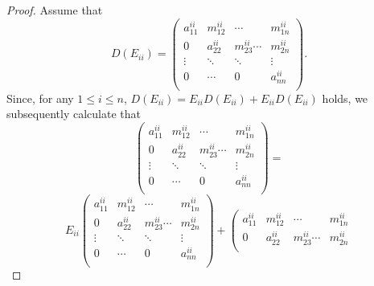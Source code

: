 \documentclass[12pt, reqno]{amsart}
\theoremstyle{definition}
\numberwithin{equation}{section}
\begin{document}
 \begin{proof} Assume that $$D(E_{ii})=\left(
                               \begin{array}{ccccc}
                                 a_{11}^{ii} &m_{12}^{ii}&\cdots &  m_{1n}^{ii} \\
                                 0 & a_{22}^{ii}&m_{23}^{ii}\cdots &m_{2n}^{ii}\\
                                   \vdots &\ddots&\ddots&\vdots  \\
                                   0 &\cdots &0& a_{nn}^{ii}\\
                               \end{array}
                             \right).$$ Since, for any $1\leq i\leq n$, $D(E_{ii})=E_{ii}D(E_{ii})+E_{ii}D(E_{ii})$ holds, we subsequently calculate that
                             $$\left(
                               \begin{array}{ccccc}
                                 a_{11}^{ii} &m_{12}^{ii}&\cdots &  m_{1n}^{ii} \\
                                 0 & a_{22}^{ii}&m_{23}^{ii}\cdots &m_{2n}^{ii}\\
                                   \vdots &\ddots&\ddots&\vdots  \\
                                   0 &\cdots &0& a_{nn}^{ii}\\
                               \end{array}
                             \right)=$$$$E_{ii}\left(
                               \begin{array}{ccccc}
                                 a_{11}^{ii} &m_{12}^{ii}&\cdots &  m_{1n}^{ii} \\
                                 0 & a_{22}^{ii}&m_{23}^{ii}\cdots &m_{2n}^{ii}\\
                                   \vdots &\ddots&\ddots&\vdots  \\
                                   0 &\cdots &0& a_{nn}^{ii}\\
                               \end{array}
                             \right)+\left(
                               \begin{array}{ccccc}
                                 a_{11}^{ii} &m_{12}^{ii}&\cdots &  m_{1n}^{ii} \\
                                 0 & a_{22}^{ii}&m_{23}^{ii}\cdots &m_{2n}^{ii}\\

\end{array}$$
\end{proof}
\end{document}
